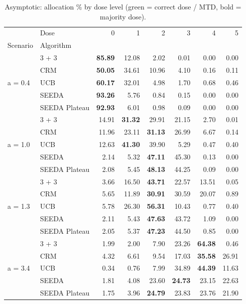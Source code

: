 \begin{table}
\centering
\caption{Asymptotic: allocation \% by dose level (green = correct dose / MTD, bold = majority dose).}
\label{tab:asym_alloc_by_dose}
\begin{tabular}{llrrrrrr}
\toprule
 & Dose & 0 & 1 & 2 & 3 & 4 & 5 \\
Scenario & Algorithm &  &  &  &  &  &  \\
\midrule
\multirow[c]{5}{*}{a = 0.4} & 3 + 3 & {\cellcolor[HTML]{C8E6C9}} \bfseries 85.89 & 12.08 & 2.02 & 0.01 & 0.00 & 0.00 \\
 & CRM & {\cellcolor[HTML]{C8E6C9}} \bfseries 50.05 & 34.61 & 10.96 & 4.10 & 0.16 & 0.11 \\
 & UCB & {\cellcolor[HTML]{C8E6C9}} \bfseries 60.17 & 32.01 & 4.98 & 1.70 & 0.68 & 0.46 \\
 & SEEDA & {\cellcolor[HTML]{C8E6C9}} \bfseries 93.26 & 5.76 & 0.84 & 0.15 & 0.00 & 0.00 \\
 & SEEDA Plateau & {\cellcolor[HTML]{C8E6C9}} \bfseries 92.93 & 6.01 & 0.98 & 0.09 & 0.00 & 0.00 \\
\multirow[c]{5}{*}{a = 1.0} & 3 + 3 & 14.91 & \bfseries 31.32 & 29.91 & {\cellcolor[HTML]{C8E6C9}} 21.15 & 2.70 & 0.01 \\
 & CRM & 11.96 & 23.11 & \bfseries 31.13 & {\cellcolor[HTML]{C8E6C9}} 26.99 & 6.67 & 0.14 \\
 & UCB & 12.63 & \bfseries 41.30 & 39.90 & {\cellcolor[HTML]{C8E6C9}} 5.29 & 0.47 & 0.40 \\
 & SEEDA & 2.14 & 5.32 & \bfseries 47.11 & {\cellcolor[HTML]{C8E6C9}} 45.30 & 0.13 & 0.00 \\
 & SEEDA Plateau & 2.08 & 5.45 & \bfseries 48.13 & {\cellcolor[HTML]{C8E6C9}} 44.25 & 0.09 & 0.00 \\
\multirow[c]{5}{*}{a = 1.3} & 3 + 3 & 3.66 & 16.50 & \bfseries 43.71 & {\cellcolor[HTML]{C8E6C9}} 22.57 & 13.51 & 0.05 \\
 & CRM & 5.65 & 11.89 & \bfseries 30.91 & {\cellcolor[HTML]{C8E6C9}} 30.59 & 20.07 & 0.89 \\
 & UCB & 5.78 & 26.30 & \bfseries 56.31 & {\cellcolor[HTML]{C8E6C9}} 10.43 & 0.77 & 0.40 \\
 & SEEDA & 2.11 & 5.43 & \bfseries 47.63 & {\cellcolor[HTML]{C8E6C9}} 43.72 & 1.09 & 0.00 \\
 & SEEDA Plateau & 2.05 & 5.37 & \bfseries 47.23 & {\cellcolor[HTML]{C8E6C9}} 44.50 & 0.85 & 0.00 \\
\multirow[c]{5}{*}{a = 3.4} & 3 + 3 & 1.99 & 2.00 & 7.90 & 23.26 & \bfseries 64.38 & {\cellcolor[HTML]{C8E6C9}} 0.46 \\
 & CRM & 4.32 & 6.61 & 9.54 & 17.03 & \bfseries 35.58 & {\cellcolor[HTML]{C8E6C9}} 26.91 \\
 & UCB & 0.34 & 0.76 & 7.99 & 34.89 & \bfseries 44.39 & {\cellcolor[HTML]{C8E6C9}} 11.63 \\
 & SEEDA & 1.81 & 4.08 & 23.60 & \bfseries 24.73 & 23.15 & {\cellcolor[HTML]{C8E6C9}} 22.63 \\
 & SEEDA Plateau & 1.75 & 3.96 & \bfseries 24.79 & 23.83 & 23.76 & {\cellcolor[HTML]{C8E6C9}} 21.90 \\
\bottomrule
\end{tabular}
\end{table}
